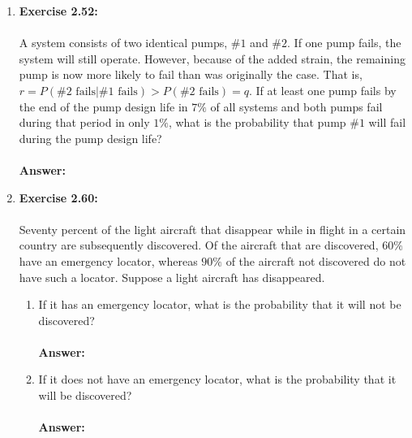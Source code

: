 \documentclass[12pt]{article}
\theoremstyle{homework}
\begin{document}
\begin{enumerate}
\item\hspace{.5in}\textbf{Exercise 2.52:} \\
\\
A system consists of two identical pumps, $\#1$ and $\#2$. If one pump fails, the system will still operate. However, because of the added strain, the remaining pump is now more likely to fail than was originally the case. That is, $r = P(\#2 \text{ fails} | \#1 \text{ fails})>P(\#2 \text{ fails}) = q$. If at least one pump fails by the end of the pump design life in $7\%$ of all systems and both pumps fail during that period in only $1\%$, what is the probability that pump $\#1$ will fail during the pump design life?\\
\\
 \textbf{Answer:}
\vspace{1in}


\item\hspace{.5in}\textbf{Exercise 2.60:} \\
\\
Seventy percent of the light aircraft that disappear while in flight in a certain country are subsequently discovered. Of the aircraft that are discovered, $60\%$ have an emergency locator, whereas $90\%$ of the aircraft not discovered do not have such a locator. Suppose a light aircraft has disappeared.
\begin{enumerate}
\item If it has an emergency locator, what is the probability that it will not be discovered?\\
\\
 \textbf{Answer:}
 \\
\item If it does not have an emergency locator, what is the probability that it will be discovered?\\
\\
 \textbf{Answer:}
 \\
\end{enumerate}
\vspace{1in}



\end{enumerate}
\end{document}
